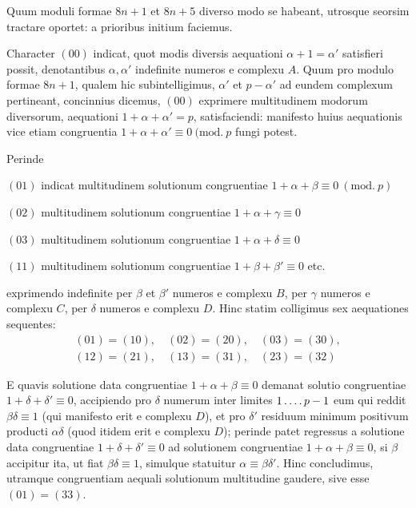 Quum moduli formae $8n+1$ et $8n+5$ diverso modo se habeant, utrosque seorsim tractare oportet: a prioribus initium faciemus.

Character $(00)$ indicat, quot modis diversis aequationi $\alpha+1=\alpha'$ satisfieri possit, denotantibus $\alpha,\alpha'$ indefinite numeros e complexu $A$. Quum pro modulo formae $8n+1$, qualem hic subintelligimus, $\alpha'$ et $p-\alpha'$ ad eundem complexum pertineant, concinnius dicemus, $(00)$ exprimere multitudinem modorum diversorum, aequationi $1+\alpha+\alpha'=p$, satisfaciendi: manifesto huius aequationis vice etiam congruentia $1+\alpha+\alpha'\equiv0\ (\mathrm{mod.}\ p$ fungi potest.

Perinde
\begin{center}
\begin{minipage}{\linewidth}
$(01)$ indicat multitudinem solutionum congruentiae $1+\alpha+\beta\equiv0\ (\mathrm{mod.}\ p)$\par
$(02)$ multitudinem solutionum congruentiae $1+\alpha+\gamma\equiv0$\par
$(03)$ multitudinem solutionum congruentiae $1+\alpha+\delta\equiv0$\par
$(11)$ multitudinem solutionum congruentiae $1+\beta+\beta'\equiv0$ etc.
\end{minipage}
\end{center}
exprimendo indefinite per $\beta$ et $\beta'$ numeros e complexu $B$, per $\gamma$ numeros e complexu $C$, per $\delta$ numeros e complexu $D$. Hinc statim colligimus sex aequationes sequentes:
\[
\begin{gathered}
(01)=(10),\quad(02)=(20),\quad(03)=(30),\\
(12)=(21),\quad(13)=(31),\quad(23)=(32)
\end{gathered}
\]

E quavis solutione data congruentiae $1+\alpha+\beta\equiv0$ demanat solutio congruentiae $1+\delta+\delta'\equiv0$, accipiendo pro $\delta$ numerum inter limites $1\mathinner{.\,.\,.\,.} p-1$
%
eum qui reddit $\beta\delta\equiv1$ (qui manifesto erit e complexu $D$), et pro $\delta'$ residuum minimum positivum producti $\alpha\delta$ (quod itidem erit e complexu $D$); perinde patet regressus a solutione data congruentiae $1+\delta+\delta'\equiv0$ ad solutionem congruentiae $1+\alpha+\beta\equiv0$, si $\beta$ accipitur ita, ut fiat $\beta\delta\equiv1$, simulque statuitur $\alpha\equiv\beta\delta'$. Hinc concludimus, utramque congruentiam aequali solutionum multitudine gaudere, sive esse $(01)=(33)$.


